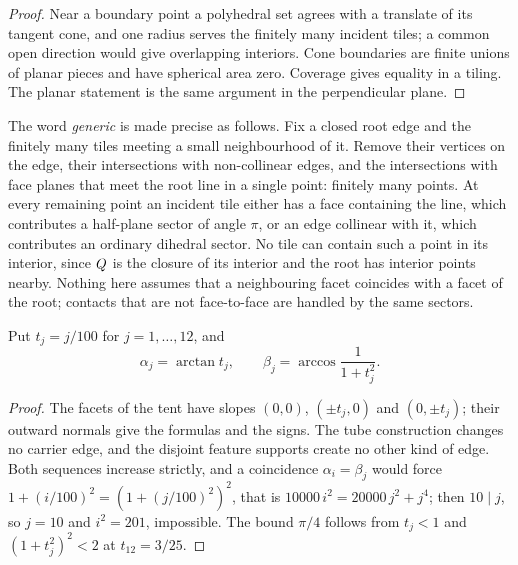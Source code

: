 \begin{proof}
Near a boundary point a polyhedral set agrees with a translate of its tangent cone, and one
radius serves the finitely many incident tiles; a common open direction would give overlapping
interiors. Cone boundaries are finite unions of planar pieces and have spherical area zero.
Coverage gives equality in a tiling. The planar statement is the same argument in the
perpendicular plane.
\end{proof}

The word \emph{generic} is made precise as follows. Fix a closed root edge and the finitely many
tiles meeting a small neighbourhood of it. Remove their vertices on the edge, their intersections
with non-collinear edges, and the intersections with face planes that meet the root line in a
single point: finitely many points. At every remaining point an incident tile either has a face
containing the line, which contributes a half-plane sector of angle $\pi$, or an edge collinear
with it, which contributes an ordinary dihedral sector. No tile can contain such a point in its
interior, since $Q$ is the closure of its interior and the root has interior points nearby.
Nothing here assumes that a neighbouring facet coincides with a facet of the root; contacts that
are not face-to-face are handled by the same sectors.

Put $t_j=j/100$ for $j=1,\dots,12$, and
\[
  \alpha_j=\arctan t_j,\qquad \beta_j=\arccos\frac{1}{1+t_j^2}.
\]


\begin{proof}
The facets of the tent have slopes $(0,0)$, $(\pm t_j,0)$ and $(0,\pm t_j)$; their outward normals
give the formulas and the signs. The tube construction changes no carrier edge, and the disjoint
feature supports create no other kind of edge. Both sequences increase strictly, and a
coincidence $\alpha_i=\beta_j$ would force $1+(i/100)^2=(1+(j/100)^2)^2$, that is
$10000\,i^2=20000\,j^2+j^4$; then $10\mid j$, so $j=10$ and $i^2=201$, impossible. The bound
$\pi/4$ follows from $t_j<1$ and $(1+t_j^2)^2<2$ at $t_{12}=3/25$.
\end{proof}


